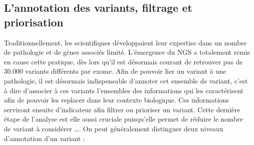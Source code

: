 \documentclass[12pt,twoside]{reedthesis}
\theoremstyle{definition}
\theoremstyle{definition}
\theoremstyle{remark}
\begin{document}
  \subsection{L'annotation des variants, filtrage et
  priorisation}\label{lannotation-des-variants-filtrage-et-priorisation}
  
  Traditionnellement, les scientifiques développaient leur expertise dans
  un nombre de pathologie et de gènes associés limité. L'émergence du NGS
  a totalement remis en cause cette pratique, dès lors qu'il est désormais
  courant de retrouver pus de 30.000 variants différents par exome. Afin
  de pouvoir lier un variant à une pathologie, il est désormais
  indispensable d'annoter cet ensemble de variant, c'est à dire d'associer
  à ces variants l'ensembles des informations qui les caractérisent afin
  de pouvoir les replacer dans leur contexte biologique. Ces informations
  serviront ensuite d'indicateur afin filtrer ou prioriser un variant.
  Cette dernière étape de l'analyse est elle aussi cruciale puisqu'elle
  permet de réduire le nombre de variant à considérer \ldots{}. On peut
  généralement distinguer deux niveaux d'annotation d'un variant :
  
\end{document}
